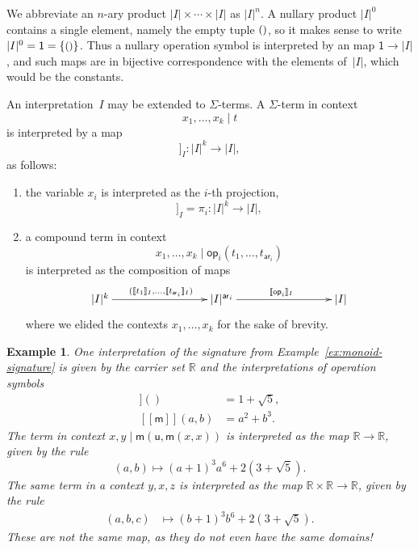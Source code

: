 \documentclass{amsart}
\newcommand{\RR}{\mathbb{R}} %
\newcommand{\carrier}[1]{|#1|} %
\newcommand{\set}[1]{\{#1\}} %
\newcommand{\op}[1]{\mathsf{op}_{#1}} %
\newcommand{\arity}[1]{\mathsf{ar}_{#1}} %
\newcommand{\one}{\mathsf{1}} %
\newcommand{\unit}{{\text{\small$()$}}} %
\newcommand{\sem}[1]{[\![#1]\!]} %
\newtheorem{example}{Example}[section]
\begin{document}
We abbreviate an $n$-ary product $\carrier{I} \times \cdots \times \carrier{I}$ as $\carrier{I}^n$. A
nullary product $\carrier{I}^0$ contains a single element, namely the empty tuple
$\unit$, so it makes sense to write $\carrier{I}^0 = \one = \set{\unit}$. Thus a nullary
operation symbol is interpreted by an map $\one \to \carrier{I}$, and such maps are in
bijective correspondence with the elements of~$\carrier{I}$, which would be the constants.

An interpretation~$I$ may be extended to $\Sigma$-terms. A $\Sigma$-term in context
%
\begin{equation*}
  x_1, \ldots, x_k \mid t
\end{equation*}
%
is interpreted by a map
%
\begin{equation*}
  \sem{x_1, \ldots, x_k \mid t}_I : \carrier{I}^k \to \carrier{I},
\end{equation*}
%
as follows:
%
\begin{enumerate}
\item the variable $x_i$ is interpreted as the $i$-th projection,
  \begin{equation*}
    \sem{x_1, \ldots, x_k \mid  x_i}_I = \pi_i : \carrier{I}^k \to \carrier{I},
  \end{equation*}
\item a compound term in context
  \begin{equation*}
    x_1, \ldots, x_k \mid \op{i}(t_1, \ldots, t_{\arity{i}})
  \end{equation*}
  is interpreted as the composition of maps
  \begin{equation*}
    \xymatrix@+6em{
      {\carrier{I}^k} \ar[r]^{(\sem{t_1}_I, \ldots, \sem{t_{\arity{i}}}_I)}
      &
      {\carrier{I}^{\arity{i}}} \ar[r]^{\sem{\op{i}}_I}
      &
      {\carrier{I}}
    }
  \end{equation*}
  where we elided the contexts $x_1, \ldots, x_k$ for the sake of brevity.
\end{enumerate}

\begin{example}
  One interpretation of the signature from Example~\ref{ex:monoid-signature} is given by
  the carrier set $\RR$ and the interpretations of operation symbols
  \begin{align*}
    \sem{\mathsf{u}}() &= 1 + \sqrt{5}, \\
    \sem{\mathsf{m}}(a, b) &= a^2 + b^3.
  \end{align*}
  The term in context $x, y \mid \mathsf{m}(\mathsf{u}, \mathsf{m}(x, x))$ is interpreted
  as the map $\RR \to \RR$, given by the rule
  \begin{equation*}
    (a, b) \mapsto (a+1)^3 a^6 + 2 (3 + \sqrt{5}).
  \end{equation*}
  The same term in a context $y, x, z$ is interpreted as the map $\RR \times \RR \to \RR$,
  given by the rule
  \begin{align*}
    (a, b, c) &\mapsto (b+1)^3 b^6 + 2 (3 + \sqrt{5}).
  \end{align*}
  These are not the same map, as they do not even have the same domains!
\end{example}
\end{document}
